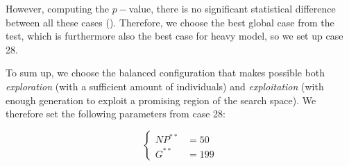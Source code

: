 \documentclass[12pt, openany]{article}
\begin{document}
However, computing the $p-$value, there is no significant statistical difference between all these cases (). Therefore, we choose the best global case from the test, which is furthermore also the best case for heavy model, so we set up case 28.

\begin{table}[H]
    \centering
    \renewcommand{\arraystretch}{1.3}
    \caption{\textbf{Summary of statistical significance tests for the AMDE population/generation ratios.} The Critical Difference (CD) sets the threshold for Nemenyi pairwise significance. No significant differences were detected ($p \ge 0.05$); the best parameter ($NP=50/G=199$, Case~28) is therefore selected based on the lowest global average rank and its dominance on the SVM evaluator.}
    \label{tab:statistical_tests_AMDE_popgen}
\end{table}

To sum up, we choose the balanced configuration that makes possible both \emph{exploration} (with a sufficient amount of individuals) and \emph{exploitation} (with enough generation to exploit a promising region of the search space). We therefore set the following parameters from case 28:

$$
\boxed{
\begin{cases}
    NP^{**} &= 50\\
    G^{**} &= 199
\end{cases}
}
$$
\end{document}
